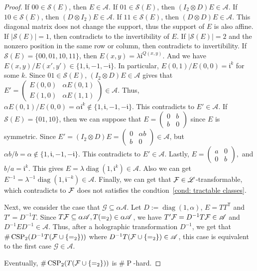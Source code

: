 \begin{proof}
    If $00\in \mathscr{S}(E)$, then $E\in \mathscr{A}$. If $01\in \mathscr{S}(E)$, then $(I_2\otimes D)E\in \mathscr{A}$. If $10\in \mathscr{S}(E)$, then $(D\otimes I_2)E\in \mathscr{A}$. If $11\in \mathscr{S}(E)$, then $(D\otimes D)E\in \mathscr{A}$. This diagonal matrix does not change the support, thus the support of $E$ is also affine. If $|\mathscr{S}(E)|=1$, then contradicts to the invertibility of $E$. If $|\mathscr{S}(E)|=2$ and the nonzero position in the same row or column, then contradicts to invertibility. If $\mathscr{S}(E)=\{00,01,10,11\}$, then $E(x,y)=\lambda\mathfrak i^{Q(x,y)}$. And we have $E(x,y)/E(x',y')\in \{1,\mathfrak i,-1,\mathfrak{-i}\}$. In particular, $E(0,1)/E(0,0)=\mathfrak i^k$ for some $k$. Since $01\in \mathscr{S}(E)$, $(I_2\otimes D)E\in \mathscr{A}$ gives that $E'=\left( \begin{matrix}
        E(0,0) & \alpha E(0,1)\\
        E(1,0) & \alpha E(1,1)
    \end{matrix}\right)\in \mathscr{A}$. Thus, $\alpha E(0,1)/E(0,0)=\alpha \mathfrak i^k\notin \{1,\mathfrak i,-1,\mathfrak{-i}\}$. This contradicts to $E'\in \mathscr{A}$. If $\mathscr{S}(E)=\{01,10\}$, then we can suppose that $E=\left(\begin{matrix}
        0 & b\\
        b & 0
    \end{matrix}\right)$ since $E$ is symmetric. Since $E'=(I_2\otimes D)E=\left( \begin{matrix}
        0 & \alpha b\\
        b & 0
    \end{matrix}\right)\in \mathscr{A}$, but $\alpha b/b=\alpha\notin \{1,\mathfrak i,-1,\mathfrak{-i}\}$. This contradicts to $E'\in\mathscr{A}$.
    Lastly, $E=\left( \begin{matrix}
        a & 0\\
        0 & b
    \end{matrix}\right),$ and $b/a=\mathfrak i^k$. This gives $E=\lambda \operatorname{diag}(1,\mathfrak i^k)\in \mathscr{A}$. Also we can get $E^{-1}=\lambda^{-1}\operatorname{diag}(1,\mathfrak i^{-k})\in \mathscr{A}$.
    Finally, we can get that $\mathcal{F}\in \mathscr{L}$-transformable, which contradicts to $\mathcal{F}$ does not satisfies the condtion~\eqref{cond: tractable classes}.

    Next, we consider the case that $\mathcal{G}\subseteq \alpha \mathscr{A}$. Let $D:=\operatorname{diag}(1,\alpha)$, $E=TT^{\mathsf T}$ and $T'=D^{-1}T$. Since $T\mathcal{F}\subseteq \alpha \mathscr{A},T(=_2)\in \alpha \mathscr{A}$, we have $T'\mathcal{F}=D^{-1}T\mathcal{F}\in \mathscr{A}$ and $D^{-1}ED^{-1}\in \mathscr{A}$. Thus, after a holographic transformation $D^{-1}$, we get that $\#\operatorname{CSP}_2(D^{-1}T(\mathcal{F}\cup \{=_2\}))$ where $D^{-1}T(\mathcal{F}\cup \{=_2\})\in \mathscr{A}$, this case is equivalent to the first case $\mathcal{G}\in \mathscr{A}$.

    Eventually, $\#\operatorname{CSP}_2(T(\mathcal{F}\cup \{=_2\}))$ is $\#\operatorname{P}$-hard.
\end{proof}

